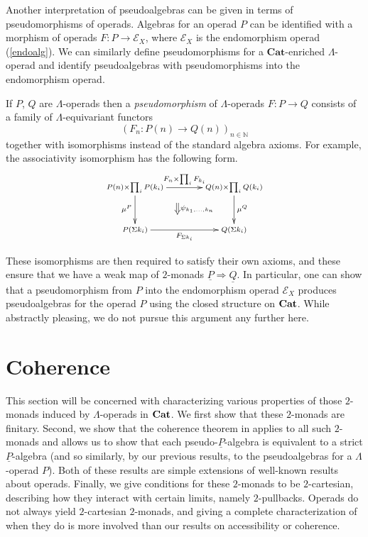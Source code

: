 \begin{rem}
Another interpretation of pseudoalgebras can be given in terms of pseudomorphisms of operads. Algebras for an operad $P$ can be identified with a morphism of operads $F \colon P \rightarrow \mathcal{E}_X$, where $\mathcal{E}_X$ is the endomorphism operad (\cref{endoalg}). We can similarly define pseudomorphisms for a $\mathbf{Cat}$-enriched $\Lambda$-operad and identify pseudoalgebras with pseudomorphisms into the endomorphism operad.

If $P$, $Q$ are $\Lambda$-operads then a \textit{pseudomorphism} of $\Lambda$-operads $F \colon P \rightarrow Q$ consists of a family of $\Lambda$-equivariant functors
            \[
                \left(F_n \colon P(n) \rightarrow Q(n)\right)_{n \in \mathbb{N}}
            \]
together with isomorphisms instead of the standard algebra axioms. For example, the associativity isomorphism has the following form.
            \[
                \xy
                    (0,0)*+{\scriptstyle P(n) \times \prod_i P(k_i)}="00";
                    (35,0)*+{\scriptstyle Q(n) \times \prod_i Q(k_i)}="10";
                    (0,-15)*+{\scriptstyle P(\Sigma k_i)}="01";
                    (35,-15)*+{\scriptstyle Q(\Sigma k_i)}="11";
                    {\ar^{F_n \times \prod_i F_{k_i}} "00" ; "10"};
                    {\ar^{\mu^Q} "10" ; "11"};
                    {\ar_{\mu^P} "00" ; "01"};
                    {\ar_{F_{\Sigma k_i}} "01" ; "11"};
                    {\ar@{=>}^{\psi_{k_1,\ldots,k_n}} (15,-5.5) ; (15,-9.5)};
                \endxy
            \]

These isomorphisms are then required to satisfy their own axioms, and these ensure that we have a weak map of $2$-monads $\underline{P} \Rightarrow \underline{Q}$. In particular, one can show that a pseudomorphism from $P$ into the endomorphism operad $\mathcal{E}_X$ produces pseudoalgebras for the operad $P$ using the closed structure on $\mathbf{Cat}$. While abstractly pleasing, we do not pursue this argument any further here.
\end{rem}

\section{Coherence}

This section will be concerned with characterizing various properties of those $2$-monads induced by $\Lambda$-operads in $\mathbf{Cat}$. We first show that these $2$-monads are finitary. Second, we show that the coherence theorem in \cite{lack-cod} applies to all such $2$-monads and allows us to show that each pseudo-$\underline{P}$-algebra is equivalent to a strict $\underline{P}$-algebra (and so similarly, by our previous results, to the pseudoalgebras for a $\Lambda$-operad $P$). Both of these results are simple extensions of well-known results about operads. Finally, we give conditions for these $2$-monads to be $2$-cartesian, describing how they interact with certain limits, namely $2$-pullbacks. Operads do not always yield $2$-cartesian $2$-monads, and giving a complete characterization of when they do is more involved than our results on accessibility or coherence.

